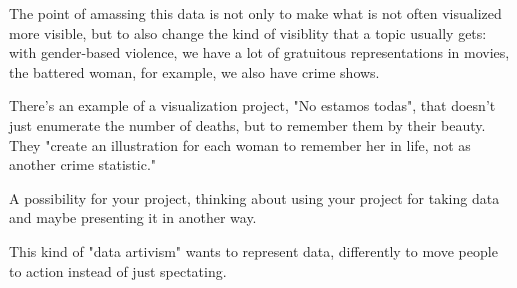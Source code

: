 \documentclass[11pt]{article}
\begin{document}
The point of amassing this data is not only to make what is not often
visualized more visible, but to also change the kind of visiblity that
a topic usually gets: with gender-based violence, we have a lot of
gratuitous representations in movies, the battered woman, for example,
we also have crime shows.

There's an example of a visualization project, "No estamos todas",
that doesn't just enumerate the number of deaths, but to remember them
by their beauty. They "create an illustration for each woman to
remember her in life, not as another crime statistic."

A possibility for your project, thinking about using your project for
taking data and maybe presenting it in another way. 

This kind of "data artivism" wants to represent data, differently to
move people to action instead of just spectating.
\end{document}

